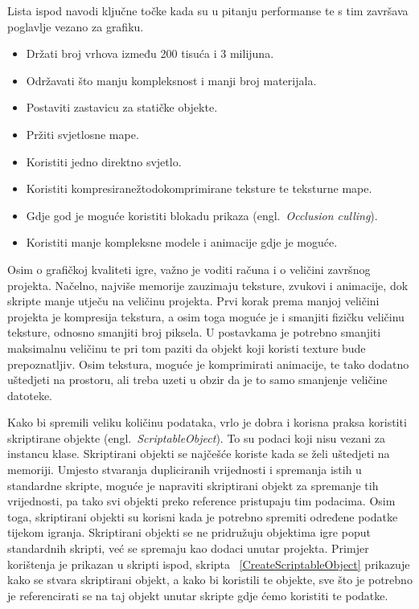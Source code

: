 Lista ispod navodi ključne točke kada su u pitanju performanse te s tim završava poglavlje vezano za grafiku.
\begin{itemize}
  \item Držati broj vrhova između 200 tisuća i 3 milijuna.
  \item Održavati što manju kompleksnost i manji broj materijala.
  \item Postaviti zastavicu za statičke objekte.
  \item Pržiti svjetlosne mape.
  \item Koristiti jedno direktno svjetlo.
  \item Koristiti kompresiranežtodo{komprimirane} teksture te teksturne mape.
  \item Gdje god je moguće koristiti blokadu prikaza (engl.~\textit{Occlusion culling}).
  \item Koristiti manje kompleksne modele i animacije gdje je moguće.
\end{itemize}

Osim o grafičkoj kvaliteti igre, važno je voditi računa i o veličini završnog projekta. Načelno, najviše memorije zauzimaju teksture, zvukovi i animacije, dok skripte manje utječu na veličinu projekta. 
Prvi korak prema manjoj veličini projekta je kompresija tekstura, a osim toga moguće je i smanjiti fizičku veličinu teksture, odnosno smanjiti broj piksela. U postavkama je potrebno smanjiti maksimalnu veličinu te pri tom paziti da objekt koji koristi texture bude prepoznatljiv.
Osim tekstura, moguće je komprimirati animacije, te tako dodatno uštedjeti na prostoru, ali treba uzeti u obzir da je to samo smanjenje veličine datoteke.

Kako bi spremili veliku količinu podataka, vrlo je dobra i korisna praksa koristiti skriptirane objekte (engl.~\textit{ScriptableObject}). To su podaci koji nisu vezani za instancu klase. Skriptirani objekti se najčešće koriste kada se želi uštedjeti na memoriji. Umjesto stvaranja dupliciranih vrijednosti i spremanja istih u standardne skripte, moguće je napraviti skriptirani objekt za spremanje tih vrijednosti, pa tako svi objekti preko reference pristupaju tim podacima. Osim toga, skriptirani objekti su korisni kada je potrebno spremiti određene podatke tijekom igranja. Skriptirani objekti se ne pridružuju objektima igre poput standardnih skripti, već se spremaju kao dodaci unutar projekta.
Primjer korištenja je prikazan u skripti ispod, skripta ~\ref{CreateScriptableObject} prikazuje kako se stvara skriptirani objekt, a kako bi koristili te objekte, sve što je potrebno je referencirati se na taj objekt unutar skripte gdje ćemo koristiti te podatke.

